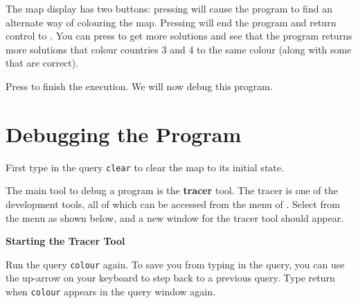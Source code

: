 The map display has two buttons: pressing  will cause the program to
find an alternate way of colouring the map. Pressing  will end the
program and return control to {\eclipse}. You can press  to get more
solutions and see that the program returns more solutions that colour
countries 3 and 4 to the same colour (along with some that are correct).

Press  to finish the execution. We will now debug this program.

\section{Debugging the Program}

First type in the query \verb'clear' to clear the map to its
initial state.

The main tool to debug a program is the {\bf tracer} tool. The tracer is
one of the development tools, all of which can be accessed from the  menu of
{\tkeclipse}. Select  from the
menu as shown below, and a new window for the tracer tool should appear.

\begin{center}

\vspace{3mm}
{\bf Starting the Tracer Tool}
\end{center}
Run the query \verb'colour' again. To save you from typing in the query,
you can use the up-arrow on your keyboard to step back to a previous query.
Type return when  \verb'colour' appears in the query window again.

